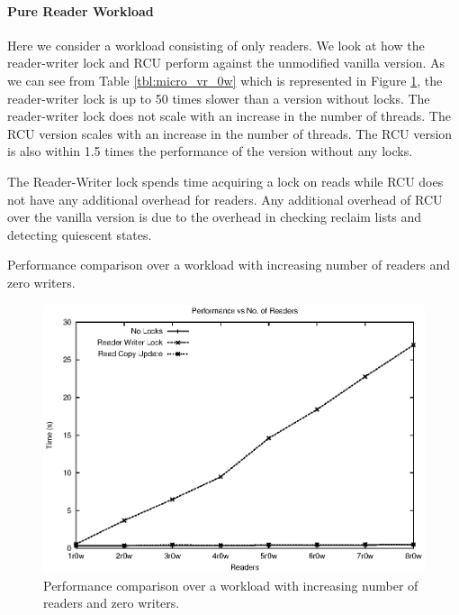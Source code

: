 \documentclass[a4paper]{article}
\begin{document}
\paragraph{Pure Reader Workload}
Here we consider a workload consisting of only readers. We look at how the reader-writer lock and RCU perform against the unmodified vanilla version.
As we can see from Table \ref{tbl:micro_vr_0w} which is represented in Figure \ref{img:micro_vr_0w}, the reader-writer lock is up to 50 times slower than a version without locks.
The reader-writer lock does not scale with an increase in the number of threads. The RCU version scales with an increase in the number of threads. The RCU version is also within 1.5 times the performance of the version without any locks.

The Reader-Writer lock spends time acquiring a lock on reads while RCU does not have any additional overhead for readers. Any additional overhead of RCU over the vanilla version is due to the overhead in checking reclaim lists and detecting quiescent states.

\begin{table}
\begin{center}
\scalebox{0.9} {

}
\end{center}
\label{tbl:micro_vr_0w}
\caption{Performance comparison over a workload with increasing number of readers and zero writers.}
\end{table}

\begin{figure}[tph]
\centering
\includegraphics[scale = 0.7]{../images/graphs/micro_vr_0w}
\caption{Performance comparison over a workload with increasing number of readers and zero writers.}
\label{img:micro_vr_0w}
\end{figure}
\end{document}
